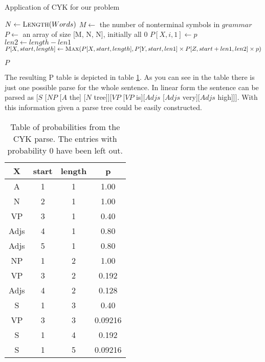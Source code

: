 \documentclass[12pt,twoside]{scrartcl}
\theoremstyle{plain}
\theoremstyle{definition}
\theoremstyle{remark}
\begin{document}
		\begin{algorithm}
			\caption{Application of CYK for our problem}
			\label{alg:cyk}
			\begin{algorithmic}[1]
					\State $N \gets \Call{Length}{Words}$
					\State $M \gets$ the number of nonterminal symbols in $grammar$
					\State $P \gets$ an array of size [M, N, N], initially all 0
							\State $P[X, i, 1] \gets p$
						\EndFor
					\EndFor
								\State $len2 \gets length - len1$
									\State $P[X, start, length] \gets \Call{Max}{P[X, start, length], P[Y, start, len1] \times P[Z, start + len1, len2] \times p}$
								
								\EndFor
							\EndFor
						\EndFor
					\EndFor
					\State \Return $P$
				\EndProcedure
			\end{algorithmic}
		\end{algorithm}
		
		The resulting P table is depicted in table \ref{tab:p}. As you can see in the table there is just one possible parse for the whole sentence. In linear form the sentence can be parsed as [$S$ [$NP$ [$A$ the] [$N$ tree]][$VP$ [$VP$ is][$Adjs$ [$Adjs$ very][$Adjs$ high]]]. With this information given a parse tree could be easily constructed.
		
		\begin{table}
			\caption{Table of probabilities from the CYK parse. The entries with probability 0 have been left out.}
			\label{tab:p}
			\centering
			\begin{tabular}{|c|c|c|c|}
				\hline
				X & start & length & p \\
				\hline
				\hline
				A & 1 & 1 & 1.00 \\
				\hline
				N & 2 & 1 & 1.00 \\
				\hline				
				VP & 3 & 1 & 0.40 \\
				\hline
				Adjs & 4 & 1 & 0.80 \\
				\hline
				Adjs & 5 & 1 & 0.80 \\
				\hline
				NP & 1 & 2 & 1.00 \\
				\hline
				VP & 3 & 2 & 0.192 \\
				\hline
				Adjs & 4 & 2 & 0.128 \\
				\hline
				S & 1 & 3 & 0.40 \\
				\hline
				VP & 3 & 3 & 0.09216 \\
				\hline
				S & 1 & 4 & 0.192 \\
				\hline
				S & 1 & 5 & 0.09216 \\
				\hline
			\end{tabular}
		\end{table}
\end{document}
